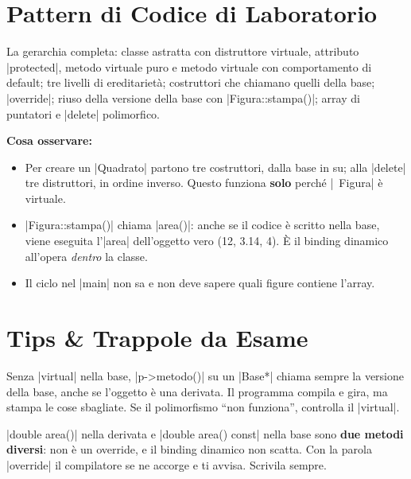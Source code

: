 \section{Pattern di Codice di Laboratorio}

La gerarchia completa: classe astratta con distruttore virtuale, attributo
\cc|protected|, metodo virtuale puro e metodo virtuale con comportamento di default;
tre livelli di ereditarietà; costruttori che chiamano quelli della base; \cc|override|;
riuso della versione della base con \cc|Figura::stampa()|; array di puntatori e
\cc|delete| polimorfico.


\textbf{Cosa osservare:}
\begin{itemize}
  \item Per creare un \cc|Quadrato| partono tre costruttori, dalla base in su; alla
        \cc|delete| tre distruttori, in ordine inverso. Questo funziona \textbf{solo}
        perché \cc|~Figura| è virtuale.
  \item \cc|Figura::stampa()| chiama \cc|area()|: anche se il codice è scritto nella
        base, viene eseguita l'\cc|area| dell'oggetto vero (12, 3.14, 4). È il binding
        dinamico all'opera \emph{dentro} la classe.
  \item Il ciclo nel \cc|main| non sa e non deve sapere quali figure contiene
        l'array.
\end{itemize}

\section{Tips \& Trappole da Esame}

\begin{trappola}
Senza \cc|virtual| nella base, \cc|p->metodo()| su un \cc|Base*| chiama sempre la
versione della base, anche se l'oggetto è una derivata. Il programma compila e gira, ma
stampa le cose sbagliate. Se il polimorfismo ``non funziona'', controlla il \cc|virtual|.
\end{trappola}

\begin{trappola}
\cc|double area()| nella derivata e \cc|double area() const| nella base sono
\textbf{due metodi diversi}: non è un override, e il binding dinamico non scatta. Con la
parola \cc|override| il compilatore se ne accorge e ti avvisa. Scrivila sempre.
\end{trappola}

